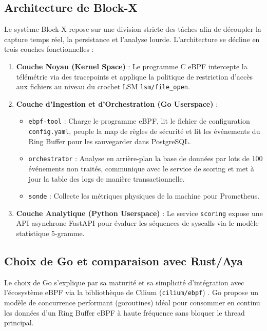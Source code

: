 \documentclass[11pt,a4paper]{article}
\begin{document}
\subsection{Architecture de Block-X}
Le système Block-X repose sur une division stricte des tâches afin de découpler la capture temps réel, la persistance et l'analyse lourde. L'architecture se décline en trois couches fonctionnelles :
\begin{enumerate}
    \item \textbf{Couche Noyau (Kernel Space)} : Le programme C eBPF intercepte la télémétrie via des tracepoints et applique la politique de restriction d'accès aux fichiers au niveau du crochet LSM \texttt{lsm/file\_open}.
    \item \textbf{Couche d'Ingestion et d'Orchestration (Go Userspace)} :
    \begin{itemize}
        \item \texttt{ebpf-tool} : Charge le programme eBPF, lit le fichier de configuration \texttt{config.yaml}, peuple la map de règles de sécurité et lit les événements du Ring Buffer pour les sauvegarder dans PostgreSQL.
        \item \texttt{orchestrator} : Analyse en arrière-plan la base de données par lots de 100 événements non traités, communique avec le service de scoring et met à jour la table des logs de manière transactionnelle.
        \item \texttt{sonde} : Collecte les métriques physiques de la machine pour Prometheus.
    \end{itemize}
    \item \textbf{Couche Analytique (Python Userspace)} : Le service \texttt{scoring} expose une API asynchrone FastAPI pour évaluer les séquences de syscalls via le modèle statistique 5-gramme.
\end{enumerate}

\subsection{Choix de Go et comparaison avec Rust/Aya}
Le choix de Go s'explique par sa maturité et sa simplicité d'intégration avec l'écosystème eBPF via la bibliothèque de Cilium (\texttt{cilium/ebpf}) \cite{learninggo, ebpfgo}. Go propose un modèle de concurrence performant (goroutines) idéal pour consommer en continu les données d'un Ring Buffer eBPF à haute fréquence sans bloquer le thread principal.
\end{document}
